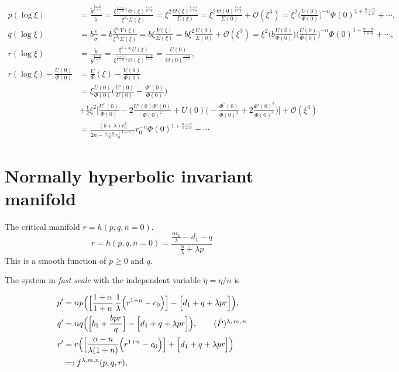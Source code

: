 \documentclass[a4paper,11pt]{article}
\def\tv{{\tilde{v}}}
\def\tth{{\tilde{\theta}}}
\def\ts{{\tilde{\sigma}}}
\def\tu{{\tilde{u}}}
\def\BO{{\mathcal{O}}}
\begin{document}
\begin{align*}
 p(\log\xi) &= \frac{ \tth^{\frac{1+\alpha}{1+n}} }{\ts} = \frac{ \xi^{\frac{1+\alpha}{1+n}c_1} \Theta(\xi)^{\frac{1+\alpha}{1+n}}}{\xi^{d_1} \Sigma(\xi)} = \xi^2\frac{\Theta(\xi)^{\frac{1+\alpha}{1+n}}}{\Sigma(\xi)} = \xi^2\frac{\Theta(0)^{\frac{1+\alpha}{1+n}}}{\Sigma(0)} + \BO(\xi^3) = \xi^2\Big(\frac{U(0)}{\Phi(0)}\Big)^{-n}\Phi(0)^{1+\frac{\alpha-n}{1+\alpha}} + \cdots,\\
 q(\log\xi) &= b\frac{\tv}{\ts} = b\frac{ \xi^{b_1} V(\xi) }{ \xi^{d_1} \Sigma(\xi)} = b\xi\frac{ V(\xi) }{ \Sigma(\xi)} = b\xi^2 \frac{U(0)}{\Sigma(0)}+ \BO(\xi^3) = \xi^2\Big(b\frac{U(0)}{\Phi(0)}\Big)\Big(\frac{U(0)}{\Phi(0)}\Big)^{-n}\Phi(0)^{1+\frac{\alpha-n}{1+\alpha}} + \cdots,\\
 r(\log\xi) &= \frac{\tu}{ \tth^{\frac{1+\alpha}{1+n}} } = \frac{ \xi^{1+b_1}U(\xi) }{ \xi^{\frac{1+\alpha}{1+n}c_1}\Theta(\xi)^{\frac{1+\alpha}{1+n}} } = \frac{ U(0) }{ \Theta(0)^{\frac{1+\alpha}{1+n}} },\\
 r(\log\xi) - \frac{ U(0) }{ \Phi(0)} &= \frac{  U }{ \Phi }(\xi) - \frac{ {U}(0)}{ \Phi(0)}\\
  &= \xi \frac{U(0)}{ \Phi(0)} \bigg(\frac{ U'(0)}{U(0)} - \frac{ \Phi'(0)}{ \Phi(0)}\bigg) \\
  &+ \frac{1}{2}\xi^2\bigg[ \frac{U^{''}(0)}{ \Phi(0)} - 2 \frac{ U'(0)\Phi'(0)}{\Phi(0)^2} + U(0) \bigg(- \frac{ \Phi^{''}(0) }{\Phi(0)^2} + 2 \frac{\Phi'(0)^2}{ \Phi(0)^3 }\bigg) \bigg] + \BO(\xi^3)\\
  &=\frac{ (b+\lambda) r_0^{2} }{ 2n - \frac{\alpha-n}{\lambda}r_0^{(1+n)}} r_0^{-n} \Phi(0)^{1+\frac{\alpha-n}{1+\alpha}} + \cdots
\end{align*}


\section{Normally hyperbolic invariant manifold}
The critical manifold $r=h(p,q,n=0)$.
\begin{equation}
 r=h(p,q,n=0) = \frac{ \frac{\alpha c_0}{\lambda} - d_1 -q }{ \frac{\alpha}{\lambda} + \lambda p}
\end{equation}
This is a smooth function of $p\ge0$ and $q$.

The system in {\it fast scale} with the independent variable $\tilde{\eta} = \eta/n$ is

\begin{align}
 p^\prime &=np\Big( \Big[\frac{1+\alpha}{1+n}\,\frac{1}{\lambda }\Big(r^{1+n}-c_0\Big)\Big] -\Big[d_1 + q + \lambda pr\Big]\Big), \nonumber \\
 q^\prime &=nq\Big(\Big[b_1 +\frac{bpr}{q}\Big] -\Big[d_1 + q + \lambda pr\Big]\Big), \tag*{($\tilde{P}$)\textsuperscript{$\lambda,m,n$}}\label{eq:pqr_fast} \\%
 r^\prime&=r\Big( \Big[\frac{\alpha-n}{\lambda(1+n)}\Big(r^{1+n}-c_0\Big)\Big]+\Big[d_1 + q + \lambda pr\Big]\Big)\nonumber \\
 &=:f^{\lambda,m,n}(p,q,r), \nonumber
\end{align}
\end{document}
